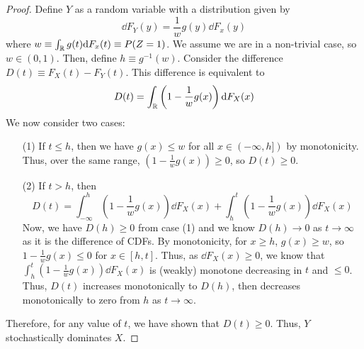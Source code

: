 \begin{proof}
Define $Y$ as a random variable with a distribution given by
%
\begin{equation}
\nonumber
\dd F_Y(y) = \frac{1}{w} g(y) \dd F_x(y)
\end{equation}
%
where $w \equiv \int_{\mathbb{R}} g(t) \mathrm{d} F_x(t) \equiv P(Z=1)$. We assume we are in a non-trivial case, so $w \in (0,1)$.
%
Then, define $h \equiv g^{-1}(w)$. Consider the difference $D(t) \equiv F_X(t) - F_Y(t)$. This difference is equivalent to
%
\begin{equation}
\nonumber
D(t) = \int_{\mathbb{R}} \left(1 - \frac{1}{w}g(x) \right) \mathrm{d} F_X(x)
\end{equation}
%
We now consider two cases:
\begin{enumerate}
\item[(1)] If $t \leq h$, then we have $g(x) \leq w$ for all $x \in (-\infty, h])$ by monotonicity. Thus, over the same range, $\left(1 - \frac{1}{w}g(x) \right) \geq 0$, so $D(t) \geq 0$.

\item[(2)] If $t > h$, then
%
\begin{equation}
\nonumber
D(t) = \int_{-\infty}^h \left(1 - \frac{1}{w}g(x) \right) \dd F_X(x) + 
	\int_{h}^t \left(1 - \frac{1}{w}g(x) \right) \dd F_X(x)
\end{equation}
%
Now, we have $D(h) \geq 0$ from case (1) and we know $D(h) \rightarrow 0$ as $t \rightarrow \infty$ as it is the difference of CDFs. By monotonicity, for $x \geq h$, $g(x) \geq w$, so $1 - \frac{1}{w}g(x) \leq 0$ for $x \in [h,t]$. Thus, as $\dd F_X(x) \geq 0$, we know that $\int_{h}^t \left(1 - \frac{1}{w}g(x)\right) \dd F_X(x)$ is (weakly) monotone decreasing in $t$ and $\leq 0$. Thus, $D(t)$ increases monotonically to $D(h)$, then decreases monotonically to zero from $h$ as $t \rightarrow \infty$.
\end{enumerate}
%
Therefore, for any value of $t$, we have shown that $D(t) \geq 0$. Thus, $Y$ stochastically dominates $X$.

\end{proof}
